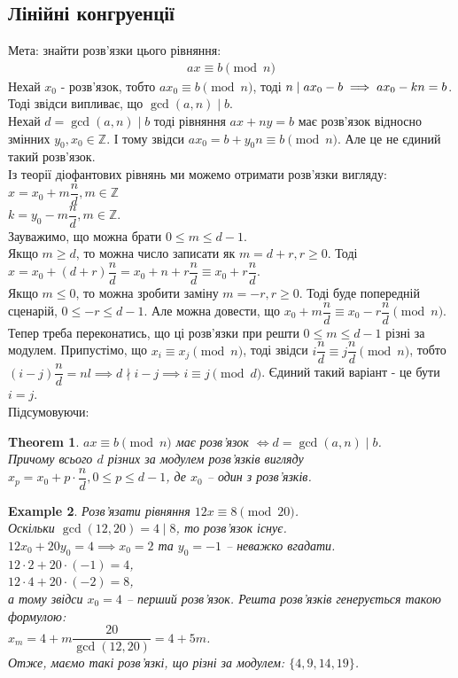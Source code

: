 \documentclass[a4paper, 14pt]{extarticle}
\theoremstyle{theoremdd}
\newtheorem{theorem}{Theorem}[subsection]
\theoremstyle{theoremdd}
\theoremstyle{theoremdd}
\theoremstyle{theoremdd}
\newtheorem{example}[theorem]{Example}
\theoremstyle{theoremdd}
\theoremstyle{theoremdd}
\theoremstyle{theoremdd}
\theoremstyle{theoremdd}
\begin{document}
\subsection{Лінійні конгруенції}
Мета: знайти розв'язки цього рівняння:
\begin{align*}
ax \equiv b \pmod n
\end{align*}
Нехай $x_0$ - розв'язок, тобто $ax_0 \equiv b \pmod n$, тоді $n \mid ax_0 - b \\ \implies ax_0 -kn = b$. Тоді звідси випливає, що $\gcd(a,n) \mid b$.
\bigskip \\
Нехай $d = \gcd(a,n) \mid b$ тоді рівняння $ax + ny = b$ має розв'язок відносно змінних $y_0,x_0 \in \mathbb{Z}$. І тому звідси $ax_0 = b + y_0 n \equiv b \pmod n$. Але це не єдиний такий розв'язок.
\bigskip \\
Із теорії діофантових рівнянь ми можемо отримати розв'язки вигляду:\\
$x = x_0 + m \dfrac{n}{d}, m \in \mathbb{Z}$\\
$k = y_0 - m \dfrac{n}{d}, m \in \mathbb{Z}$.\\
Зауважимо, що можна брати $0 \leq m \leq d-1$.\\
Якщо $m \geq d$, то можна число записати як $m = d+r, r \geq 0$. Тоді $x = x_0 + (d+r) \dfrac{n}{d} = x_0 + n + r \dfrac{n}{d} \equiv x_0 + r \dfrac{n}{d}$.\\
Якщо $m \leq 0$, то можна зробити заміну $m = -r, r \geq 0$. Тоді буде попередній сценарій, $0 \leq -r \leq d-1$. Але можна довести, що $x_0 + m \dfrac{n}{d} \equiv x_0 - r \dfrac{n}{d} \pmod n$.\\
Тепер треба переконатись, що ці розв'язки при решти $0 \leq m \leq d-1$ різні за модулем. Припустімо, що $x_i \equiv x_j \pmod n$, тоді звідси $i \dfrac{n}{d} \equiv j\dfrac{n}{d} \pmod n$, тобто $(i-j) \dfrac{n}{d} = nl \implies d \nmid i-j \implies i \equiv j \pmod d$. Єдиний такий варіант - це бути $i = j$.
\bigskip \\
Підсумовуючи:
\begin{theorem}
$ax \equiv b \pmod n$ має розв'язок $\iff d = \gcd(a,n) \mid b$.\\
Причому всього $d$ різних за модулем розв'язків вигляду \\
$x_p = x_0 + p \cdot \dfrac{n}{d}, 0 \leq p \leq d-1$, де $x_0$ -- один з розв'язків.
\end{theorem}

\begin{example}
Розв'язати рівняння $12 x \equiv 8 \pmod {20}$.\\
Оскільки $\gcd(12,20) = 4 \mid 8$, то розв'язок існує.\\
$12x_0 + 20y_0 = 4 \implies x_0 = 2$ та $y_0 = -1$ -- неважко вгадати.\\
$12 \cdot 2 + 20 \cdot (-1) = 4$,\\
$12 \cdot 4 + 20 \cdot (-2) = 8$,\\
а тому звідси $x_0=4$ -- перший розв'язок. Решта розв'язків генерується такою формулою:\\
$x_m = 4 + m\dfrac{20}{\gcd (12,20)} = 4 + 5m$.\\
Отже, маємо такі розв'язкі, що різні за модулем: $\{4,9,14,19\}$.
\end{example}
\end{document}
